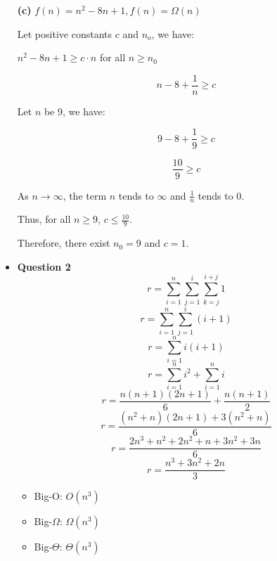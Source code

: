 \documentclass{article}
\begin{document}
\begin{itemize}
    \textbf{(c)} $f(n) = n^2 - 8n + 1, f(n) = \Omega(n)$

    Let positive constants $c$ and $n_o$, we have:

    \begin{center}
        $n^2 - 8n + 1 \ge c\cdot n$ for all $n \ge n_0$
    \end{center}

    $$n - 8 + \frac{1}{n} \ge c$$

    Let $n$ be 9, we have:

    $$9 - 8 + \frac{1}{9} \ge c$$

    $$\frac{10}{9} \ge c$$

    As $n \to \infty$, the term $n$ tends to $\infty$ and $\frac{1}{n}$ tends to $0$.

    Thus, for all $n \ge 9$, $c \le \frac{10}{9}$.

    Therefore, there exist $n_0 = 9$ and $c = 1$.\\


    \item\textbf{ Question 2}
        \begin{equation}
            r=\sum^{n}_{i=1} \sum^{i}_{j=1} \sum^{i+j}_{k=j} 1
        \end{equation}
        \begin{equation}
            r=\sum^{n}_{i=1} \sum^{i}_{j=1} (i+1)
        \end{equation}
        \begin{equation}
            r=\sum^{n}_{i=1} i(i+1)
        \end{equation}
        \begin{equation}
            r=\sum^{n}_{i=1} i^2 + \sum^{n}_{i=1} i
        \end{equation}
        \begin{equation}
            r=\frac{n(n+1)(2n+1)}{6} + \frac{n(n+1)}{2}
        \end{equation}
        \begin{equation}
            r=\frac{(n^2+n)(2n+1) + 3(n^2+n)}{6}
        \end{equation}
        \begin{equation}
            r=\frac{2n^3 + n^2 + 2n^2 + n + 3n^2 + 3n}{6}
        \end{equation}
        \begin{equation}
            r=\frac{n^3 + 3n^2 + 2n}{3}
        \end{equation}
        \begin{itemize}
            \item[] Big-O: $O(n^3)$
            \item[] Big-$\Omega$: $\Omega(n^3)$
            \item[] Big-$\Theta$: $\Theta(n^3)$
        \end{itemize}
\end{itemize}
\end{document}
